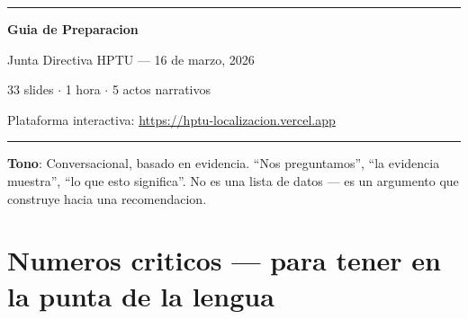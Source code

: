 \documentclass[11pt, a4paper]{article}
\begin{document}
\begin{center}
{\color{hptu}\rule{\textwidth}{2pt}}

\vspace{12pt}
{\LARGE\bfseries\color{hptu} Guia de Preparacion}

\vspace{4pt}
{\Large Junta Directiva HPTU --- 16 de marzo, 2026}

\vspace{8pt}
{\normalsize\color{slate} 33 slides $\cdot$ 1 hora $\cdot$ 5 actos narrativos}

\vspace{4pt}
{\small\color{slate} Plataforma interactiva: \url{https://hptu-localizacion.vercel.app}}

\vspace{8pt}
{\color{hptu}\rule{\textwidth}{2pt}}
\end{center}

\vspace{8pt}

\begin{tip}
\textbf{Tono}: Conversacional, basado en evidencia. ``Nos preguntamos'', ``la evidencia muestra'', ``lo que esto significa''. No es una lista de datos --- es un argumento que construye hacia una recomendacion.
\end{tip}

\section{Numeros criticos --- para tener en la punta de la lengua}
\end{document}
